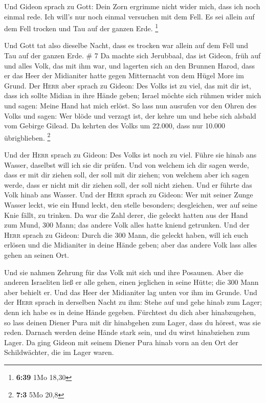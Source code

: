  Und Gideon sprach zu Gott: Dein Zorn ergrimme nicht
wider mich, dass ich noch einmal rede. Ich will's nur noch einmal
versuchen mit dem Fell. Es sei allein auf dem Fell trocken und Tau auf
der ganzen Erde. \footnote{\textbf{6:39} 1Mo 18,30}

 Und Gott tat also dieselbe Nacht, dass es trocken war
allein auf dem Fell und Tau auf der ganzen Erde. \# 7  Da
machte sich Jerubbaal, das ist Gideon, früh auf und alles Volk, das mit
ihm war, und lagerten sich an den Brunnen Harod, dass er das Heer der
Midianiter hatte gegen Mitternacht von dem Hügel More im Grund.
 Der \textsc{Herr} aber sprach zu Gideon: Des Volks ist zu
viel, das mit dir ist, dass ich sollte Midian in ihre Hände geben;
Israel möchte sich rühmen wider mich und sagen: Meine Hand hat mich
erlöst.  So lass nun ausrufen vor den Ohren des Volks und
sagen: Wer blöde und verzagt ist, der kehre um und hebe sich alsbald vom
Gebirge Gilead. Da kehrten des Volks um 22.000, dass nur 10.000
übrigblieben. \footnote{\textbf{7:3} 5Mo 20,8}

 Und der \textsc{Herr} sprach zu Gideon: Des Volks ist
noch zu viel. Führe sie hinab ans Wasser, daselbst will ich sie dir
prüfen. Und von welchem ich dir sagen werde, dass er mit dir ziehen
soll, der soll mit dir ziehen; von welchem aber ich sagen werde, dass er
nicht mit dir ziehen soll, der soll nicht ziehen.  Und er
führte das Volk hinab ans Wasser. Und der \textsc{Herr} sprach zu
Gideon: Wer mit seiner Zunge Wasser leckt, wie ein Hund leckt, den
stelle besonders; desgleichen, wer auf seine Knie fällt, zu trinken.
 Da war die Zahl derer, die geleckt hatten aus der Hand
zum Mund, 300 Mann; das andere Volk alles hatte kniend getrunken.
 Und der \textsc{Herr} sprach zu Gideon: Durch die 300
Mann, die geleckt haben, will ich euch erlösen und die Midianiter in
deine Hände geben; aber das andere Volk lass alles gehen an seinen Ort.

 Und sie nahmen Zehrung für das Volk mit sich und ihre
Posaunen. Aber die anderen Israeliten ließ er alle gehen, einen
jeglichen in seine Hütte; die 300 Mann aber behielt er. Und das Heer der
Midianiter lag unten vor ihm im Grunde.  Und der
\textsc{Herr} sprach in derselben Nacht zu ihm: Stehe auf und gehe hinab
zum Lager; denn ich habe es in deine Hände gegeben. 
Fürchtest du dich aber hinabzugehen, so lass deinen Diener Pura mit dir
hinabgehen zum Lager,  dass du hörest, was sie reden.
Darnach werden deine Hände stark sein, und du wirst hinabziehen zum
Lager. Da ging Gideon mit seinem Diener Pura hinab vorn an den Ort der
Schildwächter, die im Lager waren.

